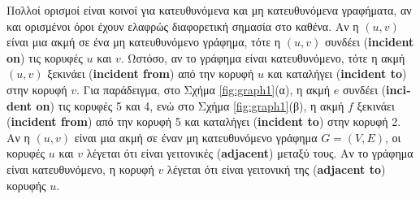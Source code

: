 \documentclass[12pt,a4paper]{article}
\begin{document}
Πολλοί ορισμοί είναι κοινοί για κατευθυνόμενα και μη κατευθυνόμενα γραφήματα, αν και ορισμένοι όροι έχουν ελαφρώς διαφορετική σημασία στο καθένα.
Αν η $(u, v)$ είναι μια ακμή σε ένα μη κατευθυνόμενο γράφημα, τότε η $(u, v)$ συνδέει (\textbf{\foreignlanguage{english}{incident on}}) τις κορυφές $u$ και $v$.
Ωστόσο, αν το γράφημα είναι κατευθυνόμενο, τότε η ακμή $(u, v)$ ξεκινάει (\textbf{\foreignlanguage{english}{incident from}}) από την κορυφή $u$ και καταλήγει (\textbf{\foreignlanguage{english}{incident to}}) στην κορυφή $v$.
Για παράδειγμα, στο Σχήμα \ref{fig:graph1}(α), η ακμή $e$ συνδέει (\textbf{\foreignlanguage{english}{incident on}}) τις κορυφές 5 και 4, ενώ στο Σχήμα \ref{fig:graph1}(β), η ακμή $f$ ξεκινάει (\textbf{\foreignlanguage{english}{incident from}}) από την κορυφή 5 και καταλήγει (\textbf{\foreignlanguage{english}{incident to}}) στην κορυφή 2.
Αν η $(u, v)$ είναι μια ακμή σε έναν μη κατευθυνόμενο γράφημα $G = (V, E)$, οι κορυφές $u$ και $v$ λέγεται ότι είναι γειτονικές (\textbf{\foreignlanguage{english}{adjacent}}) μεταξύ τους.
Αν το γράφημα είναι κατευθυνόμενο, η κορυφή $v$ λέγεται ότι είναι γειτονική της (\textbf{\foreignlanguage{english}{adjacent to}}) κορυφής $u$.
\end{document}
